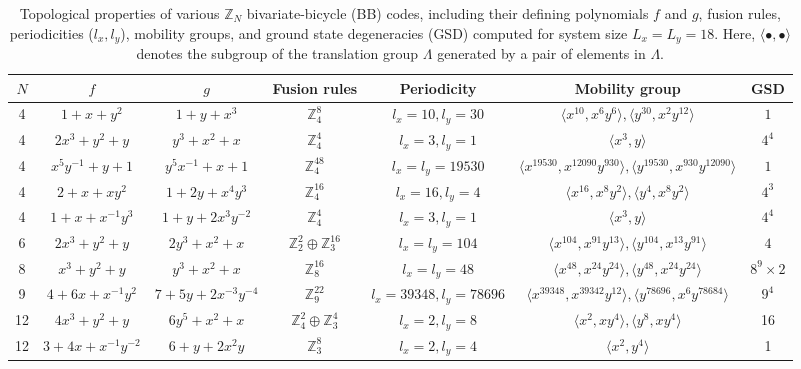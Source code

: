 \documentclass[aps,prb,english,superscriptaddress,twocolumn,tightenlines,showpacs,longbibliography,floatfix,amsfonts]{revtex4-2}
\begin{document}
\begin{table}[ht]
            \centering
            \begin{tabular}{c|c|c|c|c|c|c}
            \hline
            \hline
            $N$ & $f$ & $g$ & Fusion rules & Periodicity & Mobility group &GSD\\
            \hline
            4 & $1+x+y^2$ & $1+y+x^3$ & $\mathbb{Z}_4^8$ & $l_x=10,l_y=30$& $\langle x^{10}, x^{6}y^6\rangle,\langle y^{30}, x^{2}y^{12}\rangle$ & $1$\\
            \hline
            4 & $2x^3+y^2+y$ & $y^3+x^2+x$ &$\mathbb{Z}_4^4$&$l_x=3,l_y=1$& $\langle x^3,y\rangle$ &$4^4$\\
            \hline
            4 & $x^5y^{-1}+y+1$ & $y^5x^{-1}+x+1$ &$\mathbb{Z}_4^{48}$&$l_x=l_y=19530$& $\langle x^{19530},x^{12090}y^{930}\rangle,\langle y^{19530},x^{930}y^{12090}\rangle$&$1$\\
            \hline
            4 & $2+x+xy^2$ & $1+2y+x^4y^3$ &$\mathbb{Z}_4^{16}$&$l_x=16,l_y=4$& $\langle x^{16},x^8y^2\rangle,\langle y^4,x^8y^2\rangle$ &$4^3$\\
            \hline
            4 & $1+x+x^{-1}y^3$ & $1+y+2x^3y^{-2}$ &$\mathbb{Z}_4^4$&$l_x=3,l_y=1$& $\langle x^3,y\rangle$ &$4^4$\\
            \hline
            6 & $2x^3+y^2+y$ & $2y^3+x^2+x$ &$\mathbb{Z}_2^2\oplus\mathbb{Z}_3^{16}$&$l_x=l_y=104$& $\langle x^{104},x^{91}y^{13}\rangle,\langle y^{104},x^{13}y^{91}\rangle$ &$4$\\
            \hline
            8 & $x^3+y^2+y$ & $y^3+x^2+x$ &$\mathbb{Z}_8^{16}$&$l_x=l_y=48$&$\langle x^{48},x^{24}y^{24}\rangle,\langle y^{48},x^{24}y^{24}\rangle$&$8^9\times 2$\\
            \hline
            9 & $4+6x+x^{-1}y^{2}$ & $7+5y+2x^{-3}y^{-4}$& $\mathbb{Z}_9^{22}$& $l_x=39348,l_y=78696$ & $\langle x^{39348},x^{39342}y^{12}\rangle,\langle y^{78696},x^{6}y^{78684}\rangle$ & $9^4$\\
            \hline
            12 & $4x^3+y^2+y$ & $6y^5+x^2+x$ &$\mathbb{Z}_4^2\oplus\mathbb{Z}_3^{4}$&$l_x=2,l_y=8$& $\langle x^2,xy^4\rangle, \langle y^8,xy^4\rangle$ &16\\
            \hline
            12 & $3+4x+x^{-1}y^{-2}$ & $6+y+2x^2y$ &$\mathbb{Z}_3^{8}$&$l_x=2,l_y=4$& $\langle x^2,y^4\rangle$ & 1\\      
            \hline
            \hline
            \end{tabular}
            \caption{Topological properties of various $\mathbb{Z}_N$ bivariate-bicycle (BB) codes, including their defining polynomials $f$ and $g$, fusion rules, periodicities ($l_x, l_y$), mobility groups, and ground state degeneracies (GSD) computed for system size $L_x = L_y = 18$. Here, $\langle\bullet,\bullet\rangle$ denotes the subgroup of the translation group $\Lambda$ generated by a pair of elements in $\Lambda$.}
            \label{tab:topological properties of BB code}
\end{table}
\end{document}
